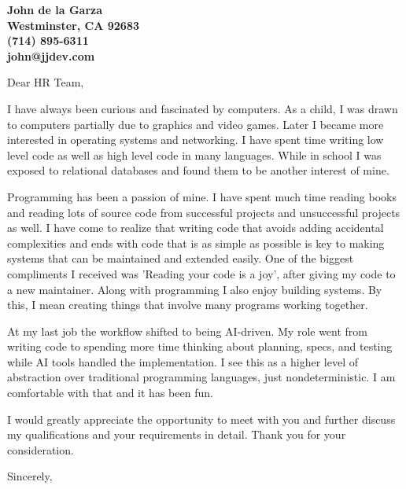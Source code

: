 \documentclass[12pt]{letter} %
\begin{document}
\begin{letter}{}

\begin{center}
	\large\bfseries %
	John de la Garza \\ %
	Westminster, CA 92683 \\
	(714) 895-6311 \\
        john@jjdev.com
\end{center}

\vspace{1cm} %

\signature{John de la Garza} %


\opening{Dear HR Team,}

I have always been curious and fascinated by computers.  As a child,
I was drawn to computers partially due to graphics and video games.
Later I became more interested in operating systems and networking.
I have spent time writing low level code as well as high level code
in many languages.  While in school I was exposed to relational
databases and found them to be another interest of mine.

Programming has been a passion of mine.  I have spent much time
reading books and reading lots of source code from successful
projects and unsuccessful projects as well.  I have come to realize
that writing code that avoids adding accidental complexities and
ends with code that is as simple as possible is key to making systems
that can be maintained and extended easily.  One of the biggest
compliments I received was 'Reading your code is a joy', after
giving my code to a new maintainer.  Along with programming I also
enjoy building systems.  By this, I mean creating things that involve
many programs working together.

At my last job the workflow shifted to being AI-driven.  My role
went from writing code to spending more time thinking about planning,
specs, and testing while AI tools handled the implementation. I see
this as a higher level of abstraction over traditional programming
languages, just nondeterministic. I am comfortable with that and
it has been fun.

I would greatly appreciate the opportunity to meet with you and
further discuss my qualifications and your requirements in detail.
Thank you for your consideration.


\closing{Sincerely,}

\end{letter}
\end{document}
